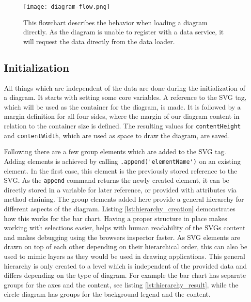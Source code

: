 \begin{figure}[ht]
    \texttt{[image: diagram-flow.png]}
    \captionsetup{width=0.9\textwidth}
    \caption[diagram-flowchart]{This flowchart describes the behavior when loading a diagram directly. As the diagram is unable to register with a data service, it will request the data directly from the data loader.}
    \label{fig:diagram-flowchart}
\end{figure}

\subsection{Initialization}\label{sec:initialization}
All things which are independent of the data are done during the initialization of a diagram. It starts with setting some core variables. A reference to the SVG tag, which will be used as the container for the diagram, is made. It is followed by a margin definition for all four sides, where the margin of our diagram content in relation to the container size is defined. The resulting values for \verb|contentHeight| and \verb|contentWidth|, which are used as space to draw the diagram, are saved. 

Following there are a few group elements which are added to the SVG tag. Adding elements is achieved by calling \verb|.append('elementName')| on an existing element. In the first case, this element is the previously stored reference to the SVG. As the \verb|append| command returns the newly created element, it can be directly stored in a variable for later reference, or provided with attributes via method chaining. The group elements added here provide a general hierarchy for different aspects of the diagram. Listing \ref{lst:hierarchy_creation} demonstrates how this works for the bar chart. Having a proper structure in place makes working with selections easier, helps with human readability of the SVGs content and makes debugging using the browsers inspector faster. As SVG elements are drawn on top of each other depending on their hierarchical order, this can also be used to mimic layers as they would be used in drawing applications. This general hierarchy is only created to a level which is independent of the provided data and differs depending on the type of diagram. For example the bar chart has separate groups for the axes and the content, see listing \ref{lst:hierarchy_result}, while the circle diagram has groups for the background legend and the content.

